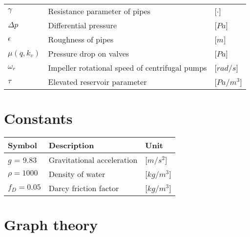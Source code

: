 \begin{tabular}{l l l}
	$\gamma$			&	Resistance parameter of pipes 						& \hspace{25mm}[$\cdot$]\\	
	$\Delta p$			&	Differential pressure 						    	& \hspace{25mm}[$Pa$]\\
	$\epsilon$			&	Roughness of pipes 						    		& \hspace{25mm}[$m$]\\	
	$\mu(q,k_v)$		&	Pressure drop on valves 						   	& \hspace{25mm}[$Pa$]\\
	$\omega_r$			&	Impeller rotational speed of centrifugal pumps 		& \hspace{25mm}[$rad/s$]\\
	$\tau$				&	Elevated reservoir parameter 			 			& \hspace{25mm}[$Pa/m^3$]\\	
\end{tabular}

\section*{Constants}

\begin{tabular}{l l l} 
	\textbf{Symbol}		&	\textbf{Description}							& \hspace{64mm}\textbf{Unit}			\\\hline						
	$g$ = 9.83 			&	Gravitational acceleration						& \hspace{64mm}[$m/s^2$]\\
	$\rho = 1000$		&	Density of water								& \hspace{64mm}[$kg/m^3$]\\
	$f_D = 0.05$			&	Darcy friction factor							& \hspace{64mm}[$kg/m^3$]\\
\end{tabular}

\section*{Graph theory}

